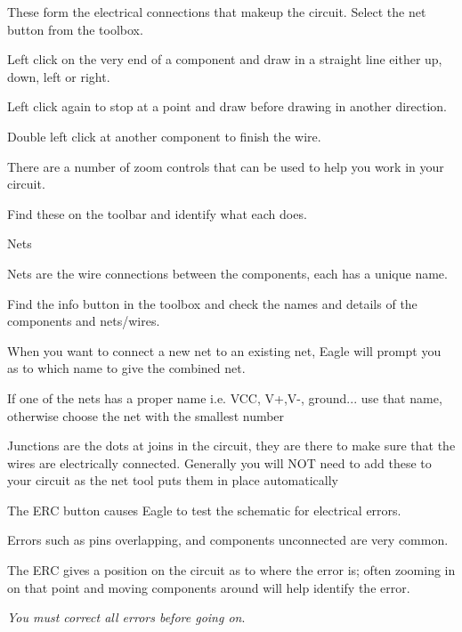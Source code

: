 
These form the electrical connections that makeup the circuit. Select the net
button from the toolbox.

\bigskip
Left click on the very end of a component and draw in a straight line either up,
down, left or right.

\bigskip
Left click again to stop at a point and draw before drawing in another
direction.

\bigskip
Double left click at another component to finish the wire.


There are a number of zoom controls that can be used to help you work in your
circuit.

Find these on the toolbar and identify what each does.

Nets

Nets are the wire connections between the components, each has a unique name.

Find the info button in the toolbox and check the names and details of the
components and nets/wires.

When you want to connect a new net to an existing net, Eagle will prompt you as
to which name to give the combined net.

If one of the nets has a proper name i.e. VCC, V+,V-, ground... use that name,
otherwise choose the net with the smallest number


Junctions are the dots at joins in the circuit, they are there to make sure that
the wires are electrically connected. Generally you will NOT need to add these
to your circuit as the net tool puts them in place automatically


The ERC button causes Eagle to test the schematic for electrical errors.

Errors such as pins overlapping, and components unconnected are very common.

The ERC gives a position on the circuit as to where the error is; often zooming
in on that point and moving components around will help identify the error.

\emph{You must correct all errors before going on}.

\secup
